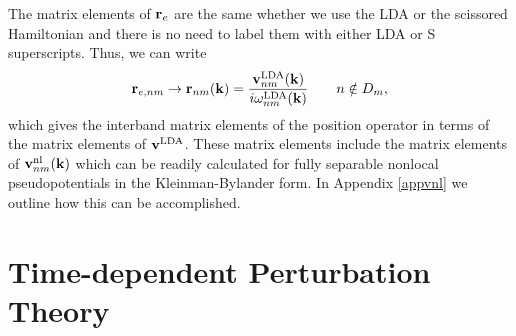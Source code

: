 \documentclass[floatfix,prb,aps,superscriptaddress,11pt,preprint,letterpaper]{revtex4}
\begin{document}
The matrix elements
of $\mathbf{r}_e$ are the same whether we use the LDA or the scissored
Hamiltonian and there is no need to label them with either LDA
or S superscripts. Thus,
we can write
\begin{equation}\label{chon.98}
\mathbf{r}_{e,nm}\to
\mathbf{r}_{nm}(\mathbf{k})=\frac{\mathbf{v}^{\mathrm{LDA}}_{nm}(\mathbf{k})}{i\omega^{\mathrm{LDA}}_{nm}(\mathbf{k})}
\quad\quad n\notin D_m
,
\end{equation}   
which gives the interband matrix elements of the position operator
in terms of the matrix elements of $\mathbf{v}^{\mathrm{LDA}}$. 
These matrix elements include the matrix elements of
$\mathbf{v}^{\mathrm{nl}}_{nm}(\mathbf{k})$ which can be readily calculated\cite{francesco} for 
fully separable nonlocal pseudopotentials in the 
Kleinman-Bylander 
form.\cite{mottaCMS10,kleinman_efficacious_1982,adolphPRB96}
In Appendix \ref{appvnl} we outline how this  
can be accomplished. 

\section{Time-dependent Perturbation Theory}\label{tdpt}
\end{document}

